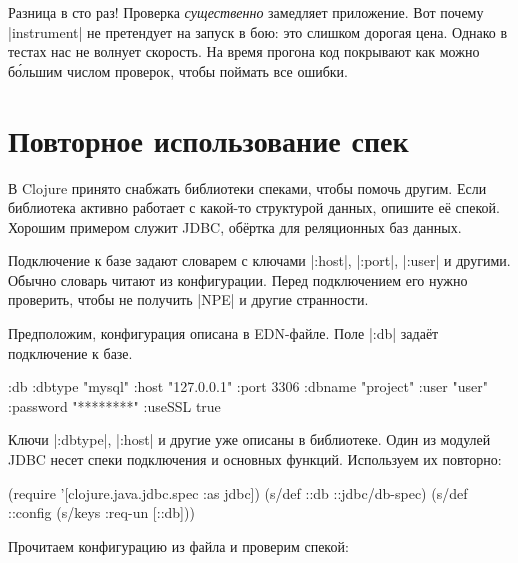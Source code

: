 
Разница в сто раз! Проверка \emph{существенно} замедляет приложение. Вот почему
\spverb|instrument| не претендует на запуск в бою: это слишком дорогая
цена. Однако в тестах нас не волнует скорость. На время прогона код покрывают
как можно б\'{о}льшим числом проверок, чтобы поймать все ошибки.

\section{Повторное использование спек}


В Clojure принято снабжать библиотеки спеками, чтобы помочь другим. Если
библиотека активно работает с какой-то структурой данных, опишите е\"{е}
спекой. Хорошим примером служит JDBC,
об\"{е}ртка для реляционных баз данных.

Подключение к базе задают словарем с ключами \spverb|:host|, \spverb|:port|,
\spverb|:user| и другими. Обычно словарь читают из конфигурации. Перед
подключением его нужно проверить, чтобы не получить \spverb|NPE| и другие
странности.


Предположим, конфигурация описана в EDN-файле. Поле \spverb|:db| зада\"{е}т
подключение к базе.


\begin{english}
  \begin{clojure}
{:db {:dbtype "mysql"
      :host "127.0.0.1"
      :port 3306
      :dbname "project"
      :user "user"
      :password "********"
      :useSSL true}}
  \end{clojure}
\end{english}

Ключи \spverb|:dbtype|, \spverb|:host| и другие уже описаны в библиотеке. Один
из модулей JDBC несет спеки подключения и основных функций. Используем их
повторно:

\begin{english}
  \begin{clojure}
(require '[clojure.java.jdbc.spec :as jdbc])
(s/def ::db ::jdbc/db-spec)
(s/def ::config (s/keys :req-un [::db]))
  \end{clojure}
\end{english}

\noindent
Прочитаем конфигурацию из файла и проверим спекой:

